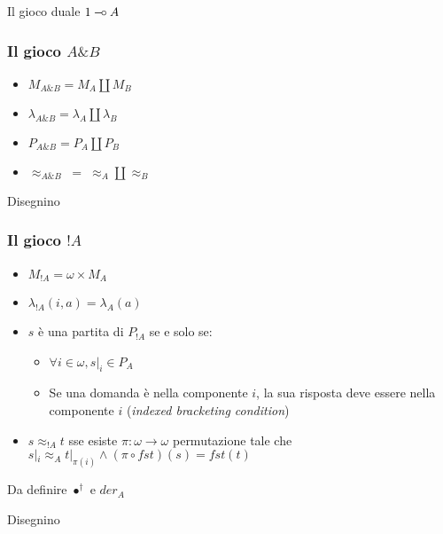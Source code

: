 \documentclass{beamer}
\newcommand{\limp}{\mathbin{{-}\mkern-3.5mu{\circ}}}
\begin{document}
\begin{frame}
	
	Il gioco duale $1 \limp A$
	
\end{frame}


\begin{frame}
	
	\frametitle{Il gioco $A \& B$}
	
	\begin{itemize}
		\item $M_{A\& B}=M_A \coprod M_B$
		\item $\lambda_{A\& B}=\lambda_A \coprod \lambda_B$
		\item $P_{A\& B}=P_A \coprod P_B$
		\item $\approx_{A\& B} \; = \; \approx_A \coprod \approx_B$ 
	\end{itemize}
	
	Disegnino
	
\end{frame}

\begin{frame}
	
	\frametitle{Il gioco $!A$}
	
	\begin{itemize}
		\item $M_{!A}=\omega \times M_A$
		\item $\lambda_{!A}(i,a)=\lambda_A(a)$
		\item $s$ è una partita di $P_{!A}$ se e solo se:
		\begin{itemize}
			\item $\forall i\in \omega , s|_i \in P_A$
			\item Se una domanda è nella componente $i$, la sua risposta deve essere nella componente $i$ (\emph{indexed bracketing condition})
		\end{itemize}

		\item $s\approx_{!A} t$ sse esiste $\pi:\omega \rightarrow \omega$ permutazione tale che $s|_i \approx_A t|_{\pi(i)} \wedge (\pi \circ fst)(s)=fst(t)$
	\end{itemize}
	
	Da definire $\bullet ^\dag$ e $der_A$
	
	Disegnino
	
\end{frame}
\end{document}
